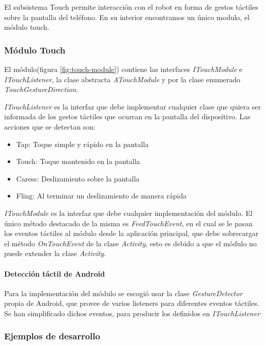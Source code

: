 El subsistema Touch permite interacción con el robot en forma de gestos táctiles sobre la pantalla del teléfono. En su interior encontramos un único modulo, el módulo touch.
\subsubsection{Módulo Touch}
El módulo(figura \ref{fig:touch-module}) contiene las interfaces \textit{ITouchModule} e \textit{ITouchListener}, la clase abstracta \textit{ATouchModule} y por la clase enumerado \textit{TouchGestureDirection}.

\textit{ITouchListener} es la interfaz que debe implementar cualquier clase que quiera ser informada de los gestos táctiles que ocurran en la pantalla del dispositivo. Las acciones que se detectan son:

\begin{itemize}
	\item  Tap: Toque simple y rápido en la pantalla
	\item  Touch: Toque mantenido en la pantalla
	\item  Caress: Deslizamiento sobre la pantalla
	\item  Fling: Al terminar un deslizamiento de manera rápida
\end{itemize}


\textit{ITouchModule} es la interfaz que debe cualquier implementación del módulo. El único método destacado de la misma es \textit{FeedTouchEvent}, en el cual se le pasan los eventos táctiles al módulo desde la aplicación principal, que debe sobrecargar el método \textit{OnTouchEvent} de la clase \textit{Activity}, esto es debido a que el módulo no puede extender la clase \textit{Activity}.

\paragraph*{Detección táctil de Android\\}


Para la implementación del módulo se escogió usar la clase \textit{GestureDetector} propia de Android, que provee de varios listeners para diferentes eventos táctiles.
Se han simplificado dichos eventos, para producir los definidos en \textit{ITouchListener}

\subsubsection*{Ejemplos de desarrollo}

